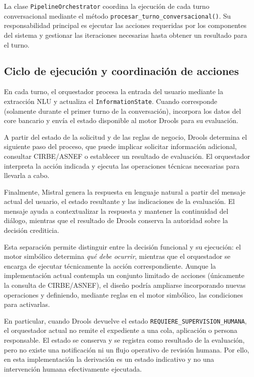 \documentclass[12pt,a4paper]{report}
\begin{document}
La clase \texttt{PipelineOrchestrator} coordina la ejecución de cada turno conversacional mediante el método \texttt{procesar\_turno\_conversacional()}. Su responsabilidad principal es ejecutar las acciones requeridas por los componentes del sistema y gestionar las iteraciones necesarias hasta obtener un resultado para el turno.

\subsection{Ciclo de ejecución y coordinación de acciones}

En cada turno, el orquestador procesa la entrada del usuario mediante la extracción NLU y actualiza el \texttt{InformationState}. Cuando corresponde (solamente durante el primer turno de la conversación), incorpora los datos del core bancario y envía el estado disponible al motor Drools para su evaluación.

A partir del estado de la solicitud y de las reglas de negocio, Drools determina el siguiente paso del proceso, que puede implicar solicitar información adicional, consultar CIRBE/ASNEF o establecer un resultado de evaluación. El orquestador interpreta la acción indicada y ejecuta las operaciones técnicas necesarias para llevarla a cabo.

Finalmente, Mistral genera la respuesta en lenguaje natural a partir del mensaje actual del usuario, el estado resultante y las indicaciones de la evaluación. El mensaje ayuda a contextualizar la respuesta y mantener la continuidad del diálogo, mientras que el resultado de Drools conserva la autoridad sobre la decisión crediticia.

Esta separación permite distinguir entre la decisión funcional y su ejecución: el motor simbólico determina \textit{qué debe ocurrir}, mientras que el orquestador se encarga de ejecutar técnicamente la acción correspondiente. Aunque la implementación actual contempla un conjunto limitado de acciones (únicamente la consulta de CIRBE/ASNEF), el diseño podría ampliarse incorporando nuevas operaciones y definiendo, mediante reglas en el motor simbólico, las condiciones para activarlas.

En particular, cuando Drools devuelve el estado \texttt{REQUIERE\_SUPERVISION\_HUMANA}, el orquestador actual no remite el expediente a una cola, aplicación o persona responsable. El estado se conserva y se registra como resultado de la evaluación, pero no existe una notificación ni un flujo operativo de revisión humana. Por ello, en esta implementación la derivación es un estado indicativo y no una intervención humana efectivamente ejecutada.
\end{document}
